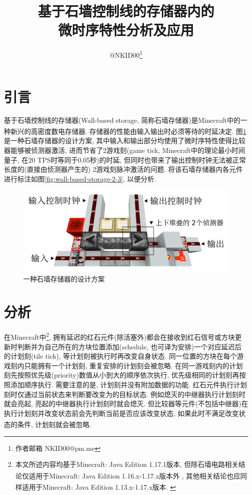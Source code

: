 \documentclass{article}
\title{基于石墙控制线的存储器内的\\微时序特性分析及应用}
\author{@NKID00\footnote{作者邮箱 NKID00@pm.me}}
\date{}
\newcommand*{\upcite}[1]{
    \textsuperscript{\cite{#1}}
}
\begin{document}
    \maketitle

    \section{引言}
    基于石墙控制线的存储器(Wall-based storage, 简称石墙存储器)是Minecraft中的一种新兴的高密度数电存储器.\upcite{bib:wall-based-storage} 存储器的性能由输入输出时必须等待的时延决定. 图\ref{fig:wall-based-storage-1}是一种石墙存储器的设计方案, 其中输入和输出部分均使用了微时序特性使得比较器能够被侦测器激活, 进而节省了2游戏刻(game tick, Minecraft中的理论最小时间量子, 在20 TPS时等同于0.05秒)的时延, 但同时也带来了输出控制时钟无法被正常长度的(直接由侦测器产生的) 2游戏刻脉冲激活的问题. 将该石墙存储器内各元件进行标注如图\ref{fig:wall-based-storage-2-3}, 以便分析.
    
    \begin{figure}[H]
        \centering
        \includegraphics[width=0.8\linewidth]{figures/wall-based-storage-1.png}
        \caption{一种石墙存储器的设计方案}
        \label{fig:wall-based-storage-1}
    \end{figure}

    \section{分析}
    在Minecraft中\footnote{本文所述内容均基于Minecraft: Java Edition 1.17.1版本, 但除石墙电路相关结论仅适用于Minecraft: Java Edition 1.16.x-1.17.x版本外\upcite{bib:wall}, 其他相关结论也应同样适用于Minecraft: Java Edition 1.13.x-1.17.x版本.\upcite{bib:tile-tick}}, 拥有延迟的红石元件(除活塞外)都会在接收到红石信号或方块更新时判断并为自己所在的方块位置添加(schedule, 也可译为安排)一个对应延迟后的计划刻(tile tick), 等计划刻被执行时再改变自身状态. 同一位置的方块在每个游戏刻内只能拥有一个计划刻, 重复安排的计划刻会被忽略. 在同一游戏刻内的计划刻先按照优先级(priority)数值从小到大的顺序依次执行, 优先级相同的计划刻再按照添加顺序执行. 需要注意的是, 计划刻并没有附加数据的功能. 红石元件执行计划刻时仅通过当前状态来判断要改变为的目标状态. 例如熄灭的中继器执行计划刻时就会亮起, 亮起的中继器执行计划刻时就会熄灭. 但比较器等元件(不包括中继器)在执行计划刻并改变状态前会先判断当前是否应该改变状态, 如果此时不满足改变状态的条件, 计划刻就会被忽略.\upcite{bib:tile-tick-component}\upcite{bib:yarn}
\end{document}
